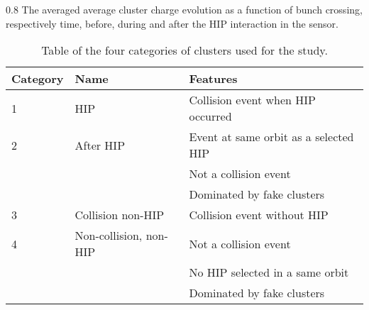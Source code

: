                  {0.8}       %
                 {The averaged average cluster charge evolution as a function of bunch crossing, respectively time, before,  during and after the HIP interaction in the sensor. } %

\begin{table}[h]
\begin{center}
\begin{tabular}{|l|l|l|}
\hline
Category & Name  & Features \\
\hline
1 & HIP & Collision event when HIP occurred \\
\hline
2 & After HIP & Event at same orbit as a selected HIP \\
& & Not a collision event \\
& & Dominated by fake clusters \\
\hline
3 & Collision non-HIP & Collision event without HIP \\
\hline
4 & Non-collision, non-HIP  & Not a collision event \\
& & No HIP selected in a same orbit \\
& & Dominated by fake clusters \\
\hline
\end{tabular}
\caption[Table caption text]{Table of the four categories of clusters used for the study. }
\label{tab:eventCategories}
\end{center}
\end{table}


\begin{table}
\begin{center}
\caption[Table caption text]{The average cluster charge, multiplicity and width and the fraction of clusters larger than 10 strips for four categories defined in table~\ref{tab:eventCategories}.}
\label{tab:clusterCategories}
\end{center}
\end{table}


